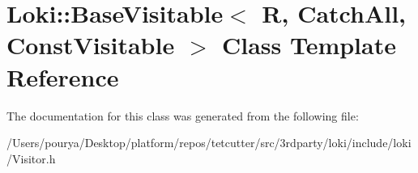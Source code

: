 \hypertarget{classLoki_1_1BaseVisitable}{}\section{Loki\+:\+:Base\+Visitable$<$ R, Catch\+All, Const\+Visitable $>$ Class Template Reference}
\label{classLoki_1_1BaseVisitable}


The documentation for this class was generated from the following file\+:\begin{DoxyCompactItemize}
\item 
/\+Users/pourya/\+Desktop/platform/repos/tetcutter/src/3rdparty/loki/include/loki/Visitor.\+h\end{DoxyCompactItemize}
